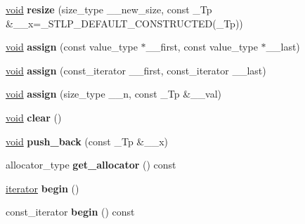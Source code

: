 \begin{DoxyCompactItemize}
\item 
\mbox{\label{structvector_a5da11b8021d3ced3dcbef3f4252f4b18}} 
\hyperlink{interfacevoid}{void} {\bfseries resize} (size\+\_\+type \+\_\+\+\_\+new\+\_\+size, const \+\_\+\+Tp \&\+\_\+\+\_\+x=\+\_\+\+S\+T\+L\+P\+\_\+\+D\+E\+F\+A\+U\+L\+T\+\_\+\+C\+O\+N\+S\+T\+R\+U\+C\+T\+ED(\+\_\+\+Tp))
\item 
\mbox{\label{structvector_a135806f81c2dcaa98893ca7e13919ddc}} 
\hyperlink{interfacevoid}{void} {\bfseries assign} (const value\+\_\+type $\ast$\+\_\+\+\_\+first, const value\+\_\+type $\ast$\+\_\+\+\_\+last)
\item 
\mbox{\label{structvector_a2147001ab9ed400b65b138dbdb35e27b}} 
\hyperlink{interfacevoid}{void} {\bfseries assign} (const\+\_\+iterator \+\_\+\+\_\+first, const\+\_\+iterator \+\_\+\+\_\+last)
\item 
\mbox{\label{structvector_ad19fffd3e7fa3c4700319593a5dd972c}} 
\hyperlink{interfacevoid}{void} {\bfseries assign} (size\+\_\+type \+\_\+\+\_\+n, const \+\_\+\+Tp \&\+\_\+\+\_\+val)
\item 
\mbox{\label{structvector_ac981f7afffb33e12f772f98a23919a04}} 
\hyperlink{interfacevoid}{void} {\bfseries clear} ()
\item 
\mbox{\label{structvector_a980b1a13a6dd709d8a8fce7ecbe97a07}} 
\hyperlink{interfacevoid}{void} {\bfseries push\+\_\+back} (const \+\_\+\+Tp \&\+\_\+\+\_\+x)
\item 
\mbox{\label{structvector_aa3f9918713c619780bf637900265b63c}} 
allocator\+\_\+type {\bfseries get\+\_\+allocator} () const
\item 
\mbox{\label{structvector_a91331710902de21946f9f22c4b027f2b}} 
\hyperlink{structiterator}{iterator} {\bfseries begin} ()
\item 
\mbox{\label{structvector_a13640884d2e3cdcad88857c551de34b0}} 
const\+\_\+iterator {\bfseries begin} () const
\item 
\mbox{\label{structvector_a0ed3ad42be9f6d5793dcaa5307e7d2e4}} 

\end{DoxyCompactItemize}
